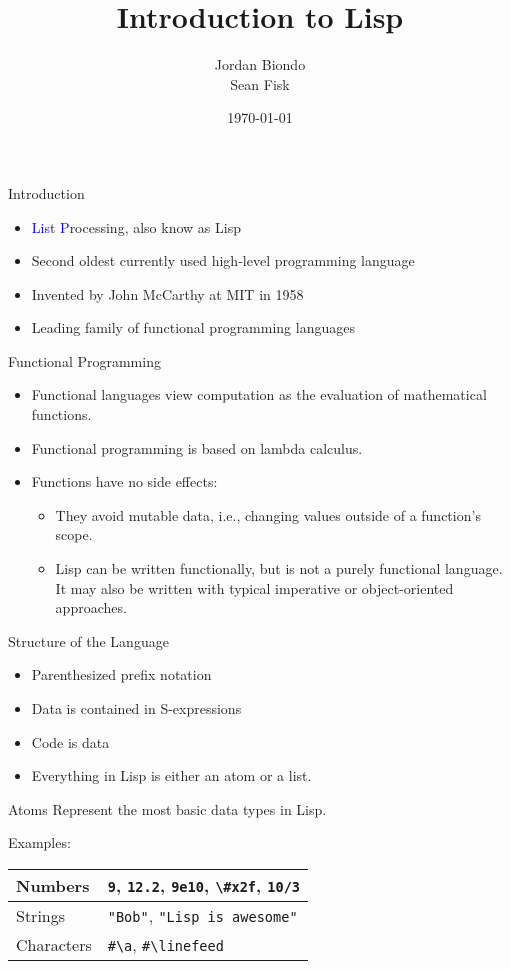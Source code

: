\documentclass{beamer}
\title[Lisp Introduction]{Introduction to Lisp}
\author{Jordan Biondo \\ Sean Fisk}
\institute{Grand Valley State University}
\date{\today}
\newcommand{\blue}[1]{\textcolor{blue}{#1}}
\begin{document}

\begin{frame}
  \titlepage
\end{frame}

\begin{frame}{Introduction}
  \begin{itemize}
  \item \blue{Lis}t \blue{P}rocessing, also know as Lisp
  \item Second oldest currently used high-level programming language
  \item Invented by John McCarthy at MIT in 1958
  \item Leading family of functional programming languages
  \end{itemize}
\end{frame}

\begin{frame}{Functional Programming}
  \begin{itemize}
  \item Functional languages view computation as the evaluation of mathematical functions.
  \item Functional programming is based on lambda calculus.
  \item Functions have no side effects:
    \begin{itemize}
    \item They avoid mutable data, i.e., changing values outside of a
      function's scope.
    \item Lisp can be written functionally, but is not a purely
      functional language. It may also be written with typical
      imperative or object-oriented approaches.
    \end{itemize}
  \end{itemize}
\end{frame}

\begin{frame}{Structure of the Language}
  \begin{itemize}
  \item Parenthesized prefix notation
  \item Data is contained in S-expressions
  \item Code is data
  \item Everything in Lisp is either an atom or a list.
  \end{itemize}
\end{frame}

\begin{frame}{Atoms}
  Represent the most basic data types in Lisp.

  Examples:

  \begin{tabu}{| X | X |}
    \hline
    Numbers & \texttt{9}, \texttt{12.2}, \texttt{9e10}, \texttt{\textbackslash\#x2f}, \texttt{10/3} \\ \hline
    Strings & \texttt{"Bob"}, \texttt{"Lisp is awesome"} \\ \hline
    Characters & \texttt{\#\textbackslash{}a}, \texttt{\#\textbackslash{}linefeed} \\ \hline
  \end{tabu}
\end{frame}
\end{document}
